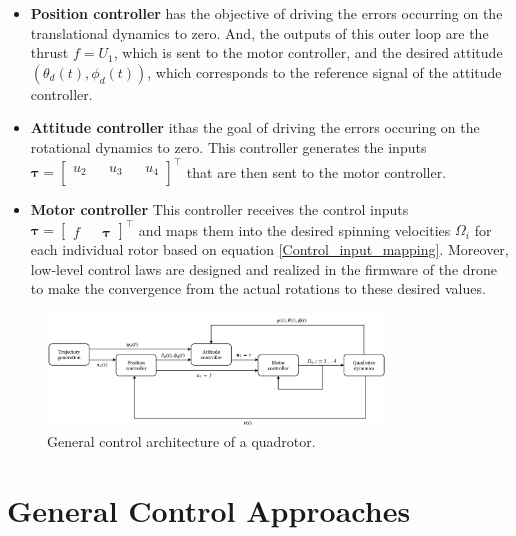 \documentclass{thesisreport}
\begin{document}
\begin{itemize}
	\setlength{\itemindent}{-.5in}
	\item [] \textbf{Position controller} has the objective of driving the errors occurring on the translational dynamics to zero.
		And, the outputs of this outer loop are the thrust $f=U_1$, which is sent to the motor controller, and the desired attitude $(\theta_d(t),\phi_d(t))$, which corresponds to the reference signal of the attitude controller.
	\item [] \textbf{Attitude controller} ithas the goal of driving the errors occuring on the rotational dynamics to zero. This controller generates the inputs 
	$\bm{\tau}=\begin{bmatrix}
	u_2 && u_3 && u_4 \\
	\end{bmatrix}^{\intercal}
	$
	that are then sent to the motor controller.
	\item [] \textbf{Motor controller} This controller receives the control inputs 	$\bm{\tau}=\begin{bmatrix}
	f && \bm{\tau}
	\end{bmatrix}^{\intercal}
	$ and maps them into the desired spinning velocities $\Omega_i$ for each individual rotor based on equation \ref{Control_input_mapping}. Moreover, low-level control laws are designed and realized in the firmware of the drone to make the convergence from the actual rotations to these desired values.
\end{itemize}
 

 
 \begin{figure}[h]
 \centering
 \includegraphics[width=0.8\textwidth]{Images/Control/General_control_architecture}
 \caption{General control architecture of a quadrotor.}
 \label{General_control_architecture}
 \end{figure}
 
 
 
 \newpage 
 \section{General Control Approaches}\label{control_approaches_for_multi_flip_maneuvers}
\end{document}

